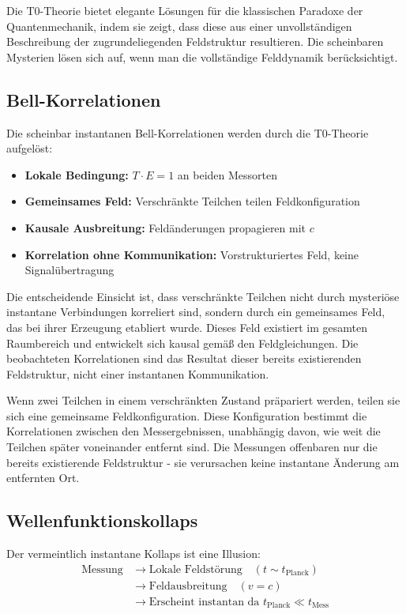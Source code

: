 \documentclass[12pt,a4paper]{article}
\begin{document}
	Die T0-Theorie bietet elegante Lösungen für die klassischen Paradoxe der Quantenmechanik, indem sie zeigt, dass diese aus einer unvollständigen Beschreibung der zugrundeliegenden Feldstruktur resultieren. Die scheinbaren Mysterien lösen sich auf, wenn man die vollständige Felddynamik berücksichtigt.
	
	\subsection{Bell-Korrelationen}
	
	Die scheinbar instantanen Bell-Korrelationen werden durch die T0-Theorie aufgelöst:
	
	\begin{itemize}
		\item \textbf{Lokale Bedingung:} $T \cdot E = 1$ an beiden Messorten
		\item \textbf{Gemeinsames Feld:} Verschränkte Teilchen teilen Feldkonfiguration
		\item \textbf{Kausale Ausbreitung:} Feldänderungen propagieren mit $c$
		\item \textbf{Korrelation ohne Kommunikation:} Vorstrukturiertes Feld, keine Signalübertragung
	\end{itemize}
	
	Die entscheidende Einsicht ist, dass verschränkte Teilchen nicht durch mysteriöse instantane Verbindungen korreliert sind, sondern durch ein gemeinsames Feld, das bei ihrer Erzeugung etabliert wurde. Dieses Feld existiert im gesamten Raumbereich und entwickelt sich kausal gemäß den Feldgleichungen. Die beobachteten Korrelationen sind das Resultat dieser bereits existierenden Feldstruktur, nicht einer instantanen Kommunikation.
	
	Wenn zwei Teilchen in einem verschränkten Zustand präpariert werden, teilen sie sich eine gemeinsame Feldkonfiguration. Diese Konfiguration bestimmt die Korrelationen zwischen den Messergebnissen, unabhängig davon, wie weit die Teilchen später voneinander entfernt sind. Die Messungen offenbaren nur die bereits existierende Feldstruktur - sie verursachen keine instantane Änderung am entfernten Ort.
	
	\subsection{Wellenfunktionskollaps}
	
	Der vermeintlich instantane Kollaps ist eine Illusion:
	\begin{align}
		\text{Messung} &\rightarrow \text{Lokale Feldstörung} \quad (t \sim t_{\text{Planck}}) \\
		&\rightarrow \text{Feldausbreitung} \quad (v = c) \\
		&\rightarrow \text{Erscheint instantan da } t_{\text{Planck}} \ll t_{\text{Mess}}
	\end{align}
	
\end{document}
